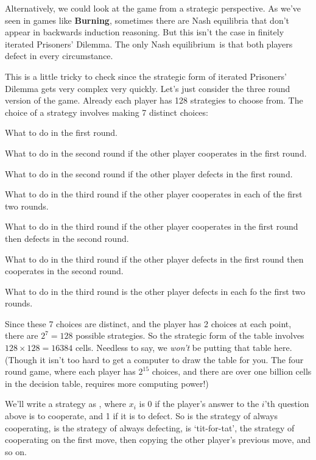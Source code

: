 \documentclass[openany]{book}
\newcommand{\eqm}{equilibrium}
\begin{document}
Alternatively, we could look at the game from a strategic perspective. As we've seen in games like \textbf{Burning}, sometimes there are Nash equilibria that don't appear in backwards induction reasoning. But this isn't the case in finitely iterated Prisoners' Dilemma. The only Nash \eqm\ is that both players defect in every circumstance.

This is a little tricky to check since the strategic form of iterated Prisoners' Dilemma gets very complex very quickly. Let's just consider the three round version of the game. Already each player has 128 strategies to choose from. The choice of a strategy involves making 7 distinct choices:

\begin{enumerate*}
\item What to do in the first round.
\item What to do in the second round if the other player cooperates in the first round.
\item What to do in the second round if the other player defects in the first round.
\item What to do in the third round if the other player cooperates in each of the first two rounds.
\item What to do in the third round if the other player cooperates in the first round then defects in the second round.
\item What to do in the third round if the other player defects in the first round then cooperates in the second round.
\item What to do in the third round is the other player defects in each fo the first two rounds.
\end{enumerate*}
Since these 7 choices are distinct, and the player has 2 choices at each point, there are $2^7 = 128$ possible strategies. So the strategic form of the table involves $128 \times 128 = 16384$ cells. Needless to say, we \textit{won't} be putting that table here. (Though it isn't too hard to get a computer to draw the table for you. The four round game, where each player has $2^{15}$ choices, and there are over one billion cells in the decision table, requires more computing power!)

We'll write a strategy as , where $x_i$ is 0 if the player's answer to the $i$'th question above is to cooperate, and 1 if it is to defect. So  is the strategy of always cooperating,  is the strategy of always defecting,  is `tit-for-tat', the strategy of cooperating on the first move, then copying the other player's previous move, and so on.
\end{document}
